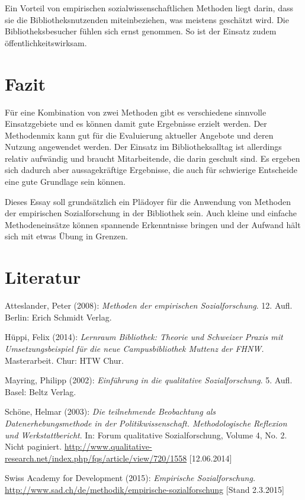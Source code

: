 \documentclass[a4paper,
fontsize=11pt,
oneside,
numbers=noperiodatend,
parskip=half-,
bibliography=totoc,
final
]{scrartcl}
\begin{document}
Ein Vorteil von empirischen sozialwissenschaftlichen Methoden liegt
darin, dass sie die Bibliotheksnutzenden miteinbeziehen, was meistens
geschätzt wird. Die Bibliotheksbesucher fühlen sich ernst genommen. So
ist der Einsatz zudem öffentlichkeitswirksam.

\section*{Fazit}\label{fazit}

Für eine Kombination von zwei Methoden gibt es verschiedene sinnvolle
Einsatzgebiete und es können damit gute Ergebnisse erzielt werden. Der
Methodenmix kann gut für die Evaluierung aktueller Angebote und deren
Nutzung angewendet werden. Der Einsatz im Bibliotheksalltag ist
allerdings relativ aufwändig und braucht Mitarbeitende, die darin
geschult sind. Es ergeben sich dadurch aber aussagekräftige Ergebnisse,
die auch für schwierige Entscheide eine gute Grundlage sein können.

Dieses Essay soll grundsätzlich ein Plädoyer für die Anwendung von
Methoden der empirischen Sozialforschung in der Bibliothek sein. Auch
kleine und einfache Methodeneinsätze können spannende Erkenntnisse
bringen und der Aufwand hält sich mit etwas Übung in Grenzen.

\section*{Literatur}\label{literatur}

Atteslander, Peter (2008): \emph{Methoden der empirischen
Sozialforschung}. 12. Aufl. Berlin: Erich Schmidt Verlag.

Hüppi, Felix (2014): \emph{Lernraum Bibliothek: Theorie und Schweizer
Praxis mit Umsetzungsbeispiel für die neue Campusbibliothek Muttenz der
FHNW.} Masterarbeit. Chur: HTW Chur.

Mayring, Philipp (2002): \emph{Einführung in die qualitative
Sozialforschung}. 5. Aufl. Basel: Beltz Verlag.

Schöne, Helmar (2003): \emph{Die teilnehmende Beobachtung als
Datenerhebungsmethode in der Politikwissenschaft. Methodologische
Reflexion und Werkstattbericht}. In: Forum qualitative Sozialforschung,
Volume 4, No. 2. Nicht paginiert.
\url{http://www.qualitative-research.net/index.php/fqs/article/view/720/1558}
{[}12.06.2014{]}

Swiss Academy for Development (2015): \emph{Empirische Sozialforschung.}
\url{http://www.sad.ch/de/methodik/empirische-sozialforschung} {[}Stand
2.3.2015{]}
\end{document}
